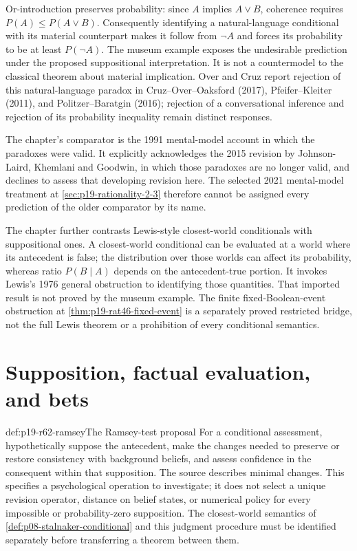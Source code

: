 Or-introduction preserves probability: since \(A\) implies
\(A\lor B\), coherence requires \(P(A)\leq P(A\lor B)\).
Consequently identifying a natural-language conditional with its material
counterpart makes it follow from \(\neg A\) and forces its probability
to be at least \(P(\neg A)\). The museum example exposes the undesirable
prediction under the proposed suppositional interpretation. It is not a
countermodel to the classical theorem about material implication.
Over and Cruz report rejection of this natural-language paradox in
Cruz--Over--Oaksford (2017), Pfeifer--Kleiter (2011), and
Politzer--Baratgin (2016); rejection of a conversational inference and
rejection of its probability inequality remain distinct responses.

The chapter's comparator is the 1991 mental-model account in which the
paradoxes were valid. It explicitly acknowledges the 2015 revision by
Johnson-Laird, Khemlani and Goodwin, in which those paradoxes are no longer
valid, and declines to assess that developing revision here. The selected
2021 mental-model treatment at \cref{sec:p19-rationality-2-3} therefore
cannot be assigned every prediction of the older comparator by its name.

The chapter further contrasts Lewis-style closest-world conditionals with
suppositional ones. A closest-world conditional can be evaluated at a world
where its antecedent is false; the distribution over those worlds can affect
its probability, whereas ratio \(P(B\mid A)\) depends on the
antecedent-true portion. It invokes Lewis's 1976 general obstruction to
identifying those quantities. That imported result is not proved by the
museum example. The finite fixed-Boolean-event obstruction at
\cref{thm:p19-rat46-fixed-event} is a separately proved restricted bridge,
not the full Lewis theorem or a prohibition of every conditional semantics.

\section{Supposition, factual evaluation, and bets}
\label{sec:p19-r62-supposition}

\begin{hbmethod}{def:p19-r62-ramsey}{The Ramsey-test proposal}
For a conditional assessment, hypothetically suppose the antecedent, make
the changes needed to preserve or restore consistency with background
beliefs, and assess confidence in the consequent within that supposition.
The source describes minimal changes. This specifies a psychological
operation to investigate; it does not select a unique revision operator,
distance on belief states, or numerical policy for every impossible or
probability-zero supposition. The closest-world semantics of
\cref{def:p08-stalnaker-conditional} and this judgment procedure must be
identified separately before transferring a theorem between them.
\end{hbmethod}

